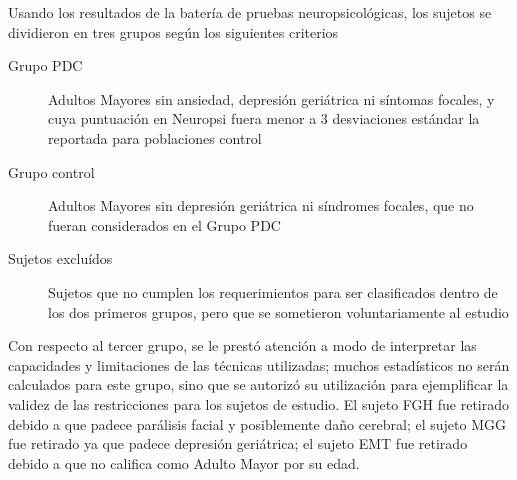 \documentclass[12pt,a4paper]{mitthesis}
\begin{document}
Usando los resultados de la bater\'ia de pruebas neuropsicol\'ogicas, los sujetos se dividieron en 
tres grupos seg\'un los siguientes criterios
\begin{description}
\item[Grupo PDC] Adultos Mayores sin ansiedad, depresi\'on geri\'atrica ni s\'intomas focales, y 
cuya puntuaci\'on en Neuropsi fuera menor a 3 desviaciones est\'andar la reportada para poblaciones
control \cite{Solis03}
\item[Grupo control] Adultos Mayores sin depresi\'on geri\'atrica ni s\'indromes focales, que no 
fueran considerados en el Grupo PDC
\item[Sujetos exclu\'idos] Sujetos que no cumplen los requerimientos para ser clasificados dentro de
los dos primeros grupos, pero que se sometieron voluntariamente al estudio
\end{description}
Con respecto al tercer grupo, se le prest\'o atenci\'on a modo de interpretar las capacidades y
limitaciones de las t\'ecnicas utilizadas; muchos estad\'isticos no ser\'an calculados para este
grupo, sino que se autoriz\'o su utilizaci\'on para ejemplificar la validez de las restricciones 
para los sujetos de estudio. El sujeto FGH fue retirado debido a que padece par\'alisis facial y 
posiblemente da\~no cerebral; el sujeto MGG fue retirado ya que padece depresi\'on geri\'atrica; el 
sujeto EMT fue retirado debido a que no califica como Adulto Mayor por su edad.
\end{document}
